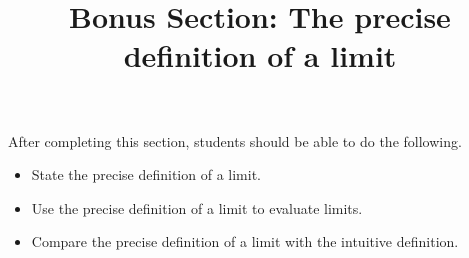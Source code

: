 \documentclass{ximera}
\title{Bonus Section: The precise definition of a limit}
\begin{document}
\begin{abstract}
\end{abstract}

\maketitle

\begin{sectionOutcomes}

After completing this section, students should be able to do the following.

\begin{itemize}
	\item State the precise definition of a limit.
	\item Use the precise definition of a limit to evaluate limits.
	\item Compare the precise definition of a limit with the intuitive definition.
\end{itemize}

\end{sectionOutcomes}
\end{document}
